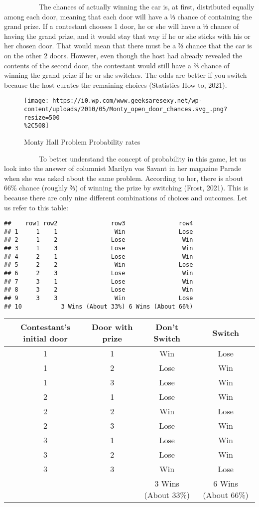 \documentclass[
]{article}
\begin{document}
~~~~~~~~~~The chances of actually winning the car is, at first,
distributed equally among each door, meaning that each door will have a
⅓ chance of containing the grand prize. If a contestant chooses 1 door,
he or she will have a ⅓ chance of having the grand prize, and it would
stay that way if he or she sticks with his or her chosen door. That
would mean that there must be a ⅔ chance that the car is on the other 2
doors. However, even though the host had already revealed the contents
of the second door, the contestant would still have a ⅔ chance of
winning the grand prize if he or she switches. The odds are better if
you switch because the host curates the remaining choices (Statistics
How to, 2021).

\begin{figure}
\centering
\texttt{[image: https://i0.wp.com/www.geeksaresexy.net/wp-content/uploads/2010/05/Monty\_open\_door\_chances.svg\_.png?resize=500\\\%2C508]}
\caption{Monty Hall Problem Probability rates}
\end{figure}

~~~~~~~~~~To better understand the concept of probability in this game,
let us look into the answer of columnist Marilyn vos Savant in her
magazine Parade when she was asked about the same problem. According to
her, there is about 66\% chance (roughly ⅔) of winning the prize by
switching (Frost, 2021). This is because there are only nine different
combinations of choices and outcomes. Let us refer to this table:

\begin{verbatim}
##    row1 row2               row3               row4
## 1     1    1                Win               Lose
## 2     1    2               Lose                Win
## 3     1    3               Lose                Win
## 4     2    1               Lose                Win
## 5     2    2                Win               Lose
## 6     2    3               Lose                Win
## 7     3    1               Lose                Win
## 8     3    2               Lose                Win
## 9     3    3                Win               Lose
## 10           3 Wins (About 33%) 6 Wins (About 66%)
\end{verbatim}

\begin{longtable}[]{@{}cccc@{}}
\toprule
Contestant's initial door & Door with prize & Don't Switch & Switch \\
\midrule
\endhead
1 & 1 & Win & Lose \\
1 & 2 & Lose & Win \\
1 & 3 & Lose & Win \\
2 & 1 & Lose & Win \\
2 & 2 & Win & Lose \\
2 & 3 & Lose & Win \\
3 & 1 & Lose & Win \\
3 & 2 & Lose & Win \\
3 & 3 & Win & Lose \\
& & 3 Wins (About 33\%) & 6 Wins (About 66\%) \\
\bottomrule
\end{longtable}
\end{document}
